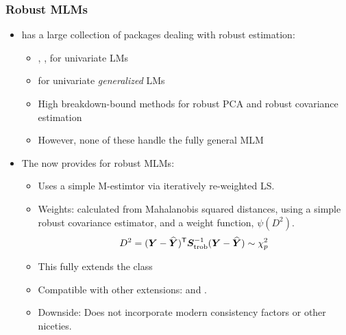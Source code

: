 \begin{frame}
  \frametitle{Robust MLMs}

  \begin{itemize}
  \item<1->  has a large collection of packages dealing with robust estimation:
    \begin{itemize}
    \item {}, , for univariate LMs
    \item {} for univariate \emph{generalized} LMs
    \item \alert{High breakdown-bound} methods for robust PCA and robust covariance estimation
    \item However, none of these handle the \alert{fully general MLM}  
    \end{itemize}
  \item<2->
    The  now provides  for robust MLMs:
    \begin{itemize}
    \item Uses a simple M-estimtor via iteratively re-weighted LS.
    \item Weights: calculated from Mahalanobis squared distances, using
    a simple robust covariance estimator, 
    and a weight function, $\psi (D^2)$.
    \begin{equation}
    D^2 = (\bm{Y} - \widehat{\bm{Y}})^\mathsf{T} \bm{S}_{\mathrm{trob}}^{-1} (\bm{Y} - \widehat{\bm{Y}})
       \sim \chi^2_p
    \end{equation}
    \item This fully extends the  class
    \item Compatible with other   extensions:  and
			.
		\item Downside: Does not incorporate modern consistency factors or other
		niceties.
    \end{itemize}
  \end{itemize}
\end{frame}

